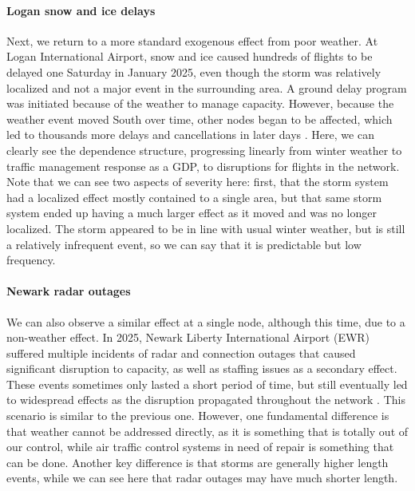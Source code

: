 \paragraph{Logan snow and ice delays} Next, we return to a more standard exogenous effect from poor weather. At Logan International Airport, snow and ice caused hundreds of flights to be delayed one Saturday in January 2025, even though the storm was relatively localized and not a major event in the surrounding area. A ground delay program was initiated because of the weather to manage capacity. However, because the weather event moved South over time, other nodes began to be affected, which led to thousands more delays and cancellations in later days \cite{nbc_logan_2025}. Here, we can clearly see the dependence structure, progressing linearly from winter weather to traffic management response as a GDP, to disruptions for flights in the network. Note that we can see two aspects of severity here: first, that the storm system had a localized effect mostly contained to a single area, but that same storm system ended up having a much larger effect as it moved and was no longer localized. The storm appeared to be in line with usual winter weather, but is still a relatively infrequent event, so we can say that it is predictable but low frequency.

\paragraph{Newark radar outages} We can also observe a similar effect at a single node, although this time, due to a non-weather effect. In 2025, Newark Liberty International Airport (EWR) suffered multiple incidents of radar and connection outages that caused significant disruption to capacity, as well as staffing issues as a secondary effect. These events sometimes only lasted a short period of time, but still eventually led to widespread effects as the disruption propagated throughout the network \cite{apnews_newark_2025}. This scenario is similar to the previous one. However, one fundamental difference is that weather cannot be addressed directly, as it is something that is totally out of our control, while air traffic control systems in need of repair is something that can be done. Another key difference is that storms are generally higher length events, while we can see here that radar outages may have much shorter length.

